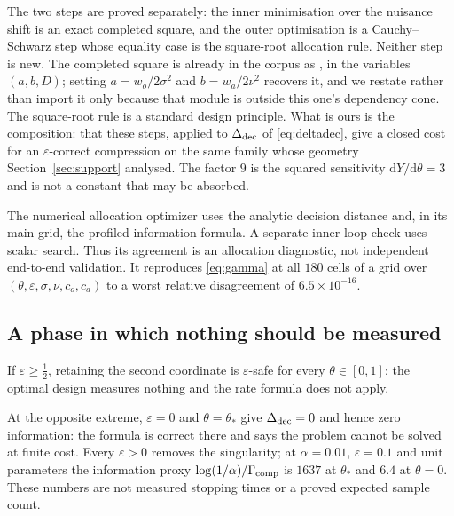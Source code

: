 The two steps are proved separately: the inner minimisation over the nuisance shift is an
exact completed square, and the outer optimisation is a Cauchy--Schwarz step whose equality
case is the square-root allocation rule. Neither step is new. The completed square is
already in the corpus as , in the
variables $(a,b,D)$; setting $a=w_{o}/2\sigma^{2}$ and $b=w_{a}/2\nu^{2}$ recovers it, and
we restate rather than import it only because that module is outside this one's dependency
cone. The square-root rule is a standard design principle. What is ours is the composition:
that these steps, applied to $\Delta_{\rm dec}$ of \eqref{eq:deltadec}, give a closed cost
for an $\varepsilon$-correct compression on the same family whose geometry
Section~\ref{sec:support} analysed. The factor $9$ is the squared sensitivity
$\mathrm{d}Y/\mathrm{d}\theta=3$ and is not a constant that may be absorbed.

The numerical allocation optimizer uses the analytic decision distance and, in its main
grid, the profiled-information formula. A separate inner-loop check uses scalar search.
Thus its agreement is an allocation diagnostic, not independent end-to-end validation. It reproduces \eqref{eq:gamma} at all $180$ cells of a grid over
$(\theta,\varepsilon,\sigma,\nu,c_{o},c_{a})$ to a worst relative disagreement of
$6.5\times10^{-16}$. \NUM{}

\subsection{A phase in which nothing should be measured}

If $\varepsilon\ge\tfrac12$, retaining the second coordinate is $\varepsilon$-safe for
every $\theta\in[0,1]$: the optimal design measures nothing and the rate formula does not
apply.


At the opposite extreme, $\varepsilon=0$ and $\theta=\theta_{*}$ give
$\Delta_{\rm dec}=0$ and hence zero information: the formula is correct there and says the
problem cannot be solved at finite cost. Every $\varepsilon>0$ removes the singularity;
at $\alpha=0.01$, $\varepsilon=0.1$ and unit parameters the information proxy
$\log(1/\alpha)/\Gamma_{\rm comp}$ is $1637$ at $\theta_*$ and $6.4$ at $\theta=0$.
These numbers are not measured stopping times or a proved expected sample count.

